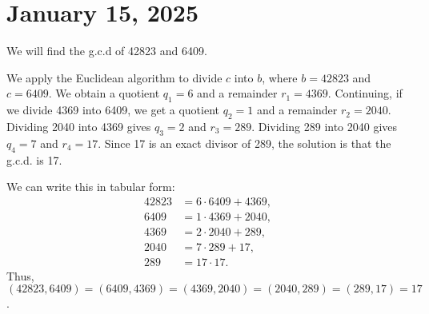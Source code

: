 \documentclass[11pt]{article}
\begin{document}
\section{January 15, 2025}
\begin{example}
    We will find the g.c.d of 42823 and 6409.
\end{example}
\begin{solution}

    We apply the Euclidean algorithm to divide \(c\) into \(b\), where \(b =
    42823\) and \(c = 6409\). We obtain a quotient \(q_1 = 6\) and a remainder
    \(r_1 = 4369\). Continuing, if we divide 4369 into 6409, we get a quotient
    \(q_2 = 1\) and a remainder \(r_2 = 2040\). Dividing 2040 into 4369 gives \(q_3
    = 2\) and \(r_3 = 289\). Dividing 289 into 2040 gives \(q_4 = 7\) and \(r_4 =
    17\). Since 17 is an exact divisor of 289, the solution is that the g.c.d. is
    17.

    We can write this in tabular form:
    \[
        \begin{aligned}
            42823 & = 6 \cdot 6409 + 4369, \\
            6409  & = 1 \cdot 4369 + 2040, \\
            4369  & = 2 \cdot 2040 + 289,  \\
            2040  & = 7 \cdot 289 + 17,    \\
            289   & = 17 \cdot 17.
        \end{aligned}
    \]
    Thus, \((42823, 6409) = (6409, 4369) = (4369, 2040) = (2040, 289) = (289, 17) =
    17\).
\end{solution}
\end{document}
